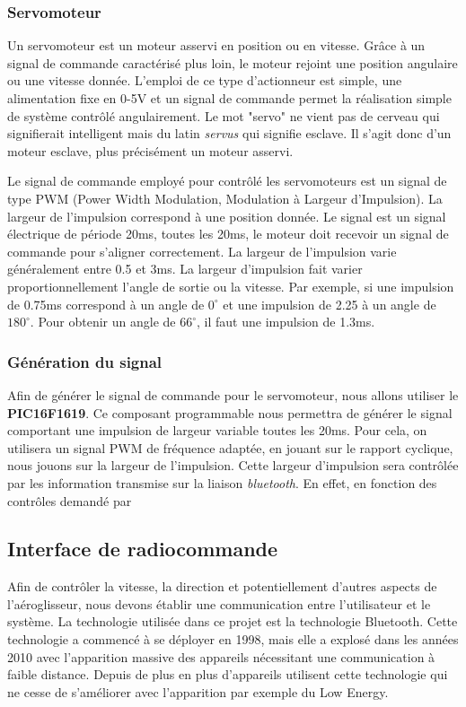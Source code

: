 \documentclass[a4paper,12pt]{book}
\begin{document}
			\subsubsection{Servomoteur}
			Un servomoteur est un moteur asservi en position ou en vitesse. Grâce à un signal de commande caractérisé plus loin, le moteur rejoint une position angulaire ou une vitesse donnée. L'emploi de ce type d'actionneur est simple, une alimentation fixe en 0-5V et un signal de commande permet la réalisation simple de système contrôlé angulairement. Le mot "servo" ne vient pas de cerveau qui signifierait intelligent mais du latin \textit{servus} qui signifie esclave. Il s'agit donc d'un moteur esclave, plus précisément un moteur asservi.
			
			Le signal de commande employé pour contrôlé les servomoteurs est un signal de type PWM (Power Width Modulation, Modulation à Largeur d'Impulsion). La largeur de l'impulsion correspond à une position donnée. Le signal est un signal électrique de période 20ms, toutes les 20ms, le moteur doit recevoir un signal de commande pour s'aligner correctement. La largeur de l'impulsion varie généralement entre 0.5 et 3ms. La largeur d'impulsion fait varier proportionnellement l'angle de sortie ou la vitesse. Par exemple, si une impulsion de 0.75ms correspond à un angle de $0^{\circ}$ et une impulsion de 2.25 à un angle de $180^{\circ}$. Pour obtenir un angle de $66^{\circ}$, il faut une impulsion de 1.3ms.   
			\subsubsection{Génération du signal}
			Afin de générer le signal de commande pour le servomoteur, nous allons utiliser le \textbf{PIC16F1619}. Ce composant programmable nous permettra de générer le signal comportant une impulsion de largeur variable toutes les 20ms. Pour cela, on utilisera un signal PWM de fréquence adaptée, en jouant sur le rapport cyclique, nous jouons sur la largeur de l'impulsion. Cette largeur d'impulsion sera contrôlée par les information transmise sur la liaison \textit{bluetooth}. En effet, en fonction des contrôles demandé par 
		\subsection{Interface de radiocommande}
			Afin de contrôler la vitesse, la direction et potentiellement d'autres aspects de l'aéroglisseur, nous devons établir une communication entre l'utilisateur et le système. La technologie utilisée dans ce projet est la technologie Bluetooth. Cette technologie a commencé à se déployer en 1998, mais elle a explosé dans les années 2010 avec l'apparition massive des appareils nécessitant une communication à faible distance. Depuis de plus en plus d'appareils utilisent cette technologie qui ne cesse de s'améliorer avec l'apparition par exemple du Low Energy.
\end{document}
